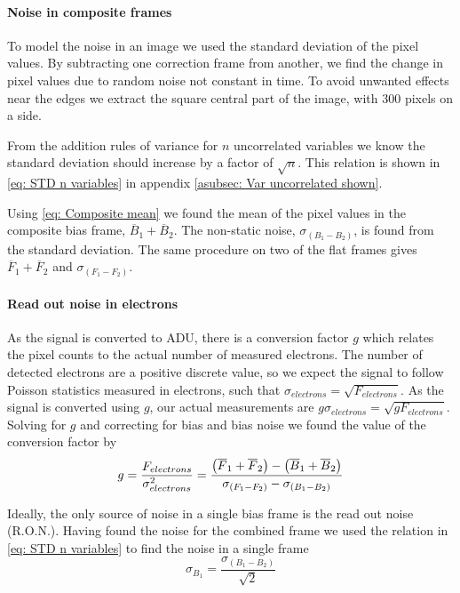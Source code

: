 \documentclass{emulateapj}
\begin{document}
\paragraph{Noise in composite frames}
To model the noise in an image we used the standard deviation of the pixel values. By subtracting one correction frame from another, we find the change in pixel values due to random noise not constant in time. To avoid unwanted effects near the edges we extract the square central part of the image, with $300$ pixels on a side.

From the addition rules of variance for $n$ uncorrelated variables \citep{STKbok} we know the standard deviation should increase by a factor of $\sqrt{n}$. This relation is shown in \cref{eq: STD n variables} in appendix \ref{asubsec: Var uncorrelated shown}.

Using \cref{eq: Composite mean} we found the mean of the pixel values in the composite bias frame, $\overline{B}_1 + \overline{B}_2$. The non-static noise, $\sigma_{(B_1-B_2)}$, is found from the standard deviation. The same procedure on two of the flat frames gives $\overline{F}_1 + \overline{F}_2$ and $\sigma_{(F_1-F_2)}$.

\paragraph{Read out noise in electrons}
As the signal is converted to ADU, there is a conversion factor $g$ which relates the pixel counts to the actual number of measured electrons. The number of detected electrons are a positive discrete value, so we expect the signal to follow Poisson statistics \citep{STKbok} measured in electrons, such that $\sigma_{electrons} = \sqrt{F_{electrons}}$. As the signal is converted using $g$, our actual measurements are $g\sigma_{electrons} = \sqrt{gF_{electrons}}$. Solving for $g$ and correcting for bias and bias noise we found the value of the conversion factor by
\begin{equation}
	g = \frac{F_{electrons}}{\sigma_{electrons}^2} = \frac{\qty(\overline{F}_1 + \overline{F}_2) - \qty(\overline{B}_1 + \overline{B}_2)}{\sigma_{(F_1-F_2)}-\sigma_{(B_1-B_2)}}
	\label{eq: Conversion factor}
\end{equation}

Ideally, the only source of noise in a single bias frame is the read out noise (R.O.N.). Having found the noise for the combined frame we used the relation in \cref{eq: STD n variables} to find the noise in a single frame 
\begin{equation}
	\sigma_{B_1} = \frac{\sigma_{(B_1-B_2)}}{\sqrt{2}}
	\label{eq: Noise one bias}
\end{equation}
\end{document}

